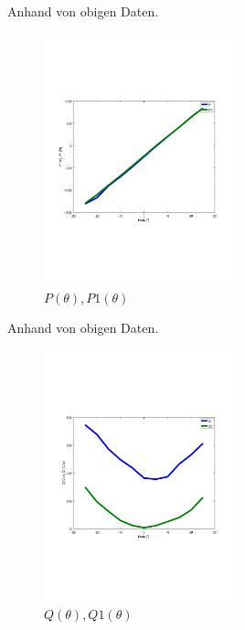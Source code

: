 Anhand von obigen Daten.
\begin{figure}[H]
  \begin{center}
  \includegraphics[width=0.5\textwidth, trim={1cm 6.5cm 2cm 7cm},clip]{pic/6_1_grundfrequenztaktung/6_1_2_einst_wirk_und_blindleistung/P_P1.pdf}
  \caption{$P(\theta), P1(\theta)$}
  \label{fig:6_1_2_2}
  \end{center}
\end{figure}


Anhand von obigen Daten.
\begin{figure}[H]
  \begin{center}
  \includegraphics[width=0.5\textwidth, trim={1cm 6.5cm 2cm 7cm},clip]{pic/6_1_grundfrequenztaktung/6_1_2_einst_wirk_und_blindleistung/Q_Q1.pdf}
  \caption{$Q(\theta), Q1(\theta)$}
  \label{fig:6_1_2_3}
  \end{center}
\end{figure}



\clearpage